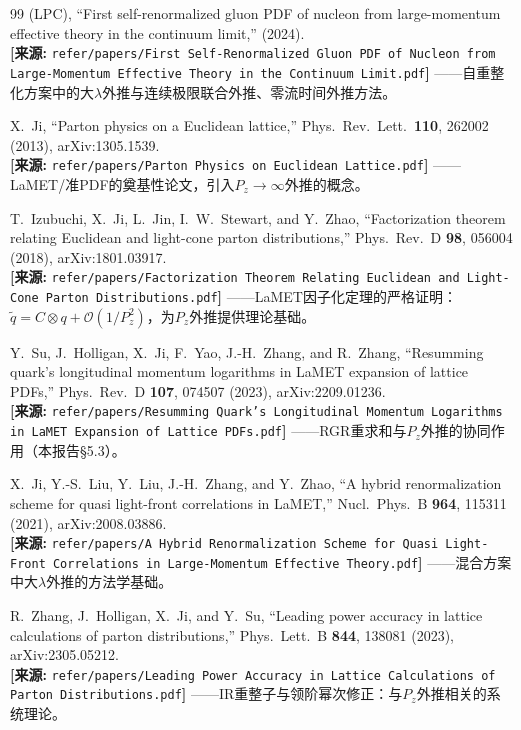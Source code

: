 \documentclass[12pt,a4paper]{ctexart}
\theoremstyle{definition}
\begin{document}
\begin{thebibliography}{99}
(LPC),
``First self-renormalized gluon PDF of nucleon from large-momentum effective theory in the continuum limit,''
(2024).
\\\textbf{[来源:} \texttt{refer/papers/First Self-Renormalized Gluon PDF of Nucleon from Large-Momentum Effective Theory in the Continuum Limit.pdf}\textbf{]}
——自重整化方案中的大$\lambda$外推与连续极限联合外推、零流时间外推方法。

X.~Ji,
``Parton physics on a Euclidean lattice,''
Phys.\ Rev.\ Lett.\ \textbf{110}, 262002 (2013), arXiv:1305.1539.
\\\textbf{[来源:} \texttt{refer/papers/Parton Physics on Euclidean Lattice.pdf}\textbf{]}
——LaMET/准PDF的奠基性论文，引入$P_z\to\infty$外推的概念。

T.~Izubuchi, X.~Ji, L.~Jin, I.~W.~Stewart, and Y.~Zhao,
``Factorization theorem relating Euclidean and light-cone parton distributions,''
Phys.\ Rev.\ D \textbf{98}, 056004 (2018), arXiv:1801.03917.
\\\textbf{[来源:} \texttt{refer/papers/Factorization Theorem Relating Euclidean and Light-Cone Parton Distributions.pdf}\textbf{]}
——LaMET因子化定理的严格证明：$\tilde q = C \otimes q + \mathcal{O}(1/P_z^2)$，为$P_z$外推提供理论基础。

Y.~Su, J.~Holligan, X.~Ji, F.~Yao, J.-H.~Zhang, and R.~Zhang,
``Resumming quark's longitudinal momentum logarithms in LaMET expansion of lattice PDFs,''
Phys.\ Rev.\ D \textbf{107}, 074507 (2023), arXiv:2209.01236.
\\\textbf{[来源:} \texttt{refer/papers/Resumming Quark's Longitudinal Momentum Logarithms in LaMET Expansion of Lattice PDFs.pdf}\textbf{]}
——RGR重求和与$P_z$外推的协同作用（本报告§5.3）。

X.~Ji, Y.-S.~Liu, Y.~Liu, J.-H.~Zhang, and Y.~Zhao,
``A hybrid renormalization scheme for quasi light-front correlations in LaMET,''
Nucl.\ Phys.\ B \textbf{964}, 115311 (2021), arXiv:2008.03886.
\\\textbf{[来源:} \texttt{refer/papers/A Hybrid Renormalization Scheme for Quasi Light-Front Correlations in Large-Momentum Effective Theory.pdf}\textbf{]}
——混合方案中大$\lambda$外推的方法学基础。

R.~Zhang, J.~Holligan, X.~Ji, and Y.~Su,
``Leading power accuracy in lattice calculations of parton distributions,''
Phys.\ Lett.\ B \textbf{844}, 138081 (2023), arXiv:2305.05212.
\\\textbf{[来源:} \texttt{refer/papers/Leading Power Accuracy in Lattice Calculations of Parton Distributions.pdf}\textbf{]}
——IR重整子与领阶幂次修正：与$P_z$外推相关的系统理论。


\end{thebibliography}
\end{document}
